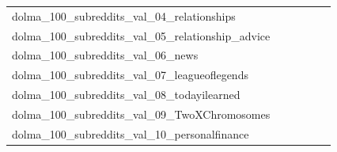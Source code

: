 \documentclass[dvipsnames]{article}
\begin{document}
\begin{appendix}
{\begin{longtable}{m{6cm}m{1.7cm}m{1.7cm}m{1.7cm}m{1.7cm}m{1.7cm}}
	dolma\_100\_subreddits\_val\_04\_relationships  & \colorbox[HTML]{ffffe5}{\makebox[\mywidth][c]{18.64}} & \colorbox[HTML]{cae99c}{\makebox[\mywidth][c]{17.80}} & \colorbox[HTML]{ffffe5}{\makebox[\mywidth][c]{18.89}} & \colorbox[HTML]{e1f3a9}{\makebox[\mywidth][c]{17.86}} & \colorbox[HTML]{77c578}{\makebox[\mywidth][c]{17.67}}\\
	dolma\_100\_subreddits\_val\_05\_relationship\_advice  & \colorbox[HTML]{ffffe5}{\makebox[\mywidth][c]{19.40}} & \colorbox[HTML]{afdd8f}{\makebox[\mywidth][c]{18.53}} & \colorbox[HTML]{ffffe5}{\makebox[\mywidth][c]{19.68}} & \colorbox[HTML]{def2a6}{\makebox[\mywidth][c]{18.63}} & \colorbox[HTML]{77c578}{\makebox[\mywidth][c]{18.46}}\\
	dolma\_100\_subreddits\_val\_06\_news  & \colorbox[HTML]{ffffe5}{\makebox[\mywidth][c]{22.49}} & \colorbox[HTML]{b0de8f}{\makebox[\mywidth][c]{21.25}} & \colorbox[HTML]{ffffe5}{\makebox[\mywidth][c]{22.51}} & \colorbox[HTML]{f6fbb8}{\makebox[\mywidth][c]{21.49}} & \colorbox[HTML]{77c578}{\makebox[\mywidth][c]{21.17}}\\
	dolma\_100\_subreddits\_val\_07\_leagueoflegends  & \colorbox[HTML]{ffffe5}{\makebox[\mywidth][c]{34.45}} & \colorbox[HTML]{d4eea0}{\makebox[\mywidth][c]{32.41}} & \colorbox[HTML]{ffffe5}{\makebox[\mywidth][c]{35.13}} & \colorbox[HTML]{dbf1a4}{\makebox[\mywidth][c]{32.46}} & \colorbox[HTML]{77c578}{\makebox[\mywidth][c]{32.04}}\\
	dolma\_100\_subreddits\_val\_08\_todayilearned  & \colorbox[HTML]{ffffe5}{\makebox[\mywidth][c]{22.53}} & \colorbox[HTML]{d8efa2}{\makebox[\mywidth][c]{21.30}} & \colorbox[HTML]{ffffe5}{\makebox[\mywidth][c]{22.68}} & \colorbox[HTML]{ceeb9e}{\makebox[\mywidth][c]{21.28}} & \colorbox[HTML]{77c578}{\makebox[\mywidth][c]{21.10}}\\
	dolma\_100\_subreddits\_val\_09\_TwoXChromosomes  & \colorbox[HTML]{ffffe5}{\makebox[\mywidth][c]{20.20}} & \colorbox[HTML]{ceeb9e}{\makebox[\mywidth][c]{19.16}} & \colorbox[HTML]{ffffe5}{\makebox[\mywidth][c]{20.25}} & \colorbox[HTML]{dff2a7}{\makebox[\mywidth][c]{19.20}} & \colorbox[HTML]{77c578}{\makebox[\mywidth][c]{19.02}}\\
	dolma\_100\_subreddits\_val\_10\_personalfinance  & \colorbox[HTML]{ffffe5}{\makebox[\mywidth][c]{18.62}} & \colorbox[HTML]{7fc97b}{\makebox[\mywidth][c]{17.65}} & \colorbox[HTML]{ffffe5}{\makebox[\mywidth][c]{18.82}} & \colorbox[HTML]{b7e193}{\makebox[\mywidth][c]{17.73}} & \colorbox[HTML]{77c578}{\makebox[\mywidth][c]{17.64}}\\

\end{longtable}}
\end{appendix}
\end{document}
